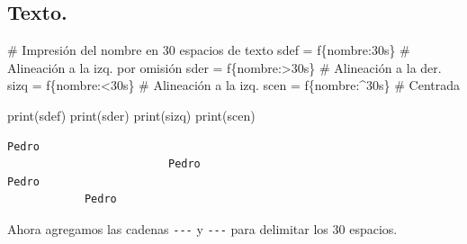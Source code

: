 \documentclass[
  spanish,
  letterpaper,
]{scrbook}
\newenvironment{Shaded}{\begin{snugshade}}{\end{snugshade}}
\newcommand{\BuiltInTok}[1]{\textcolor[rgb]{0.00,0.23,0.31}{#1}}
\newcommand{\CommentTok}[1]{\textcolor[rgb]{0.37,0.37,0.37}{#1}}
\newcommand{\NormalTok}[1]{\textcolor[rgb]{0.00,0.23,0.31}{#1}}
\newcommand{\OperatorTok}[1]{\textcolor[rgb]{0.37,0.37,0.37}{#1}}
\newcommand{\SpecialCharTok}[1]{\textcolor[rgb]{0.37,0.37,0.37}{#1}}
\newcommand{\SpecialStringTok}[1]{\textcolor[rgb]{0.13,0.47,0.30}{#1}}
\theoremstyle{definition}
\theoremstyle{remark}
\begin{document}
\subsection{Texto.}\label{texto.}

\begin{Shaded}
\begin{Highlighting}[]
\CommentTok{\# Impresión del nombre en 30 espacios de texto}
\NormalTok{sdef }\OperatorTok{=} \SpecialStringTok{f\textquotesingle{}}\SpecialCharTok{\{}\NormalTok{nombre}\SpecialCharTok{:30s\}}\SpecialStringTok{\textquotesingle{}}  \CommentTok{\# Alineación a la izq. por omisión}
\NormalTok{sder }\OperatorTok{=} \SpecialStringTok{f\textquotesingle{}}\SpecialCharTok{\{}\NormalTok{nombre}\SpecialCharTok{:\textgreater{}30s\}}\SpecialStringTok{\textquotesingle{}} \CommentTok{\# Alineación a la der.}
\NormalTok{sizq }\OperatorTok{=} \SpecialStringTok{f\textquotesingle{}}\SpecialCharTok{\{}\NormalTok{nombre}\SpecialCharTok{:\textless{}30s\}}\SpecialStringTok{\textquotesingle{}} \CommentTok{\# Alineación a la izq.}
\NormalTok{scen }\OperatorTok{=} \SpecialStringTok{f\textquotesingle{}}\SpecialCharTok{\{}\NormalTok{nombre}\SpecialCharTok{:\^{}30s\}}\SpecialStringTok{\textquotesingle{}} \CommentTok{\# Centrada}
\end{Highlighting}
\end{Shaded}

\begin{Shaded}
\begin{Highlighting}[]
\BuiltInTok{print}\NormalTok{(sdef)}
\BuiltInTok{print}\NormalTok{(sder)}
\BuiltInTok{print}\NormalTok{(sizq)}
\BuiltInTok{print}\NormalTok{(scen)}
\end{Highlighting}
\end{Shaded}

\begin{verbatim}
Pedro                         
                         Pedro
Pedro                         
            Pedro             
\end{verbatim}

Ahora agregamos las cadenas \texttt{-\/-\/-\textbar{}} y
\texttt{\textbar{}-\/-\/-} para delimitar los 30 espacios.
\end{document}
